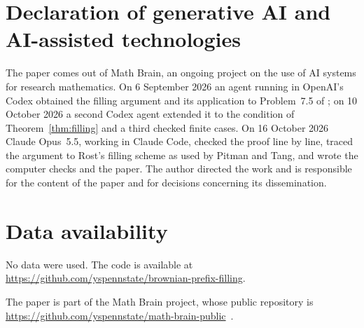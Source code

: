 \documentclass[11pt]{amsart}
\theoremstyle{remark}
\numberwithin{equation}{section}
\begin{document}
\section*{Declaration of generative AI and AI-assisted technologies}
The paper comes out of Math Brain, an ongoing project on the use of AI systems for research mathematics. On 6 September 2026 an agent running in OpenAI's Codex obtained the filling argument and its application to Problem~7.5 of \cite{BS}; on 10 October 2026 a second Codex agent extended it to the condition of Theorem~\ref{thm:filling} and a third checked finite cases. On 16 October 2026 Claude Opus~5.5, working in Claude Code, checked the proof line by line, traced the argument to Rost's filling scheme as used by Pitman and Tang, and wrote the computer checks and the paper. The author directed the work and is responsible for the content of the paper and for decisions concerning its dissemination.

\section*{Data availability}
No data were used. The code is available at\\ \url{https://github.com/yspennstate/brownian-prefix-filling}.

The paper is part of the Math Brain project, whose public repository is \url{https://github.com/yspennstate/math-brain-public}~\cite{MathBrainRepo}.
\end{document}
